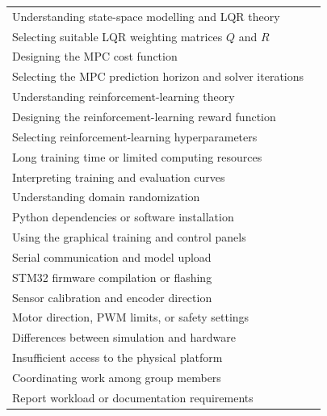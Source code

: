 \documentclass[11pt,a4paper]{article}
\begin{document}
{\begin{table}[H]
\begin{tabularx}{\linewidth}{Y C}
Understanding state-space modelling and LQR theory
& \\

Selecting suitable LQR weighting matrices $Q$ and $R$
& \\

Designing the MPC cost function
& \\

Selecting the MPC prediction horizon and solver iterations
& \\

Understanding reinforcement-learning theory
& \\

Designing the reinforcement-learning reward function
& \\

Selecting reinforcement-learning hyperparameters
& \\

Long training time or limited computing resources
& \\

Interpreting training and evaluation curves
& \\

Understanding domain randomization
& \\

Python dependencies or software installation
& \\

Using the graphical training and control panels
& \\

Serial communication and model upload
& \\

STM32 firmware compilation or flashing
& \\

Sensor calibration and encoder direction
& \\

Motor direction, PWM limits, or safety settings
& \\

Differences between simulation and hardware
& \\

Insufficient access to the physical platform
& \\

Coordinating work among group members
& \\

Report workload or documentation requirements
& \\


\end{tabularx}
\end{table}}
\end{document}

